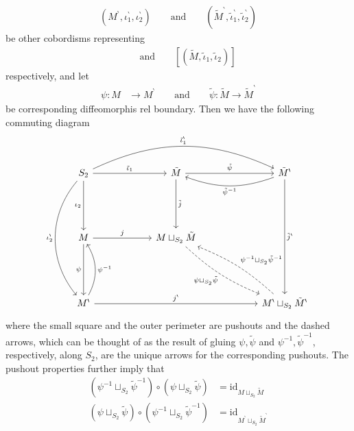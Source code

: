 \begin{align*}
  \left(
    M^{\backprime}
    ,
    \iota_{1}^{\backprime}
    ,
    \iota_{2}^{\backprime}
  \right)
  \qquad
  \text{and}
  \qquad
  \left(
    \tilde{M}^{\backprime}
    ,
    \tilde{\iota}_{1}^{\backprime}
    ,
    \tilde{\iota}_{2}^{\backprime}
  \right)
\end{align*}
be other cobordisms representing
\begin{align*}
  [(M,\iota_{1},\iota_{2})]
  \qquad
  \text{and}
  \qquad
  [(\tilde{M},\tilde{\iota}_{1},\tilde{\iota}_{2})]
\end{align*}
respectively, and let
\begin{align*}
  \psi
  \colon
  M
  &\to
  M^{\backprime}
  \qquad
  \text{and}
  \qquad
  \tilde{\psi}
  \colon
  \tilde{M}
  \to
  \tilde{M}^{\backprime}
\end{align*}
be corresponding diffeomorphis rel boundary. Then we have the following commuting diagram
\begin{equation*}
\begin{tikzcd}[row sep=5em,column sep=6em]
  S_{2}
  \ar{r}{\tilde{\iota}_{1}}
  \ar[bend left=25]{rr}{\tilde{\iota}_{1}^{\backprime}}
  \ar[swap]{d}{\iota_{2}}
  \ar[bend right=40]{dd}[swap]{\iota_{2}^{\backprime}}
  &
  \tilde{M}
  \ar{r}{\tilde{\psi}}
  \ar{d}{\tilde{j}}
  &
  \tilde{M}^{\backprime}
  \ar{dd}{\tilde{j}^{\backprime}}
  \ar[bend left=20]{l}{\tilde{\psi}^{-1}}
  \\
  M
  \ar{r}{j}
  \ar{d}[swap]{\psi}
  &
  M
  \sqcup_{S_{2}}
  \tilde{M}
  \ar[bend right=10,dashed]{rd}[swap]{\psi \sqcup_{S_{2}} \tilde{\psi}}
  \\
  M^{\backprime}
  \ar[bend right]{u}[swap]{\psi^{-1}}
  \ar{rr}{j^{\backprime}}
  &
  &
  M^{\backprime}
  \sqcup_{S_{2}}
  \tilde{M}^{\backprime}
  \ar[bend right=10,dashed]{ul}[swap]{\psi^{-1} \sqcup_{S_{2}} \tilde{\psi}^{-1}}
\end{tikzcd}
\end{equation*}
where the small square and the outer perimeter are pushouts and the dashed arrows, which can be thought of as the result of {\glqq}gluing{\grqq} $\psi,\tilde{\psi}$ and $\psi^{-1},\tilde{\psi}^{-1}$, respectively, along $S_{2}$, are the unique arrows for the corresponding pushouts. The pushout properties further imply that
\begin{align*}
  \left(
    \psi^{-1}
    \sqcup_{S_{2}}
    \tilde{\psi}^{-1}
  \right)
  \circ
  \left(
    \psi
    \sqcup_{S_{2}}
    \tilde{\psi}
  \right)
  &=
  \mathrm{id}_{M \sqcup_{S_{2}} \tilde{M}}
  \\
  \left(
    \psi
    \sqcup_{S_{2}}
    \tilde{\psi}
  \right)
  \circ
  \left(
    \psi^{-1}
    \sqcup_{S_{2}}
    \tilde{\psi}^{-1}
  \right)
  &=
  \mathrm{id}_{M^{\backprime} \sqcup_{S_{2}} \tilde{M}^{\backprime}}
\end{align*}
